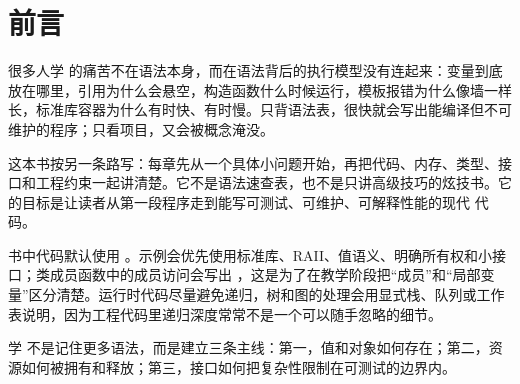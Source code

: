 \chapter*{前言}

很多人学 \cpp 的痛苦不在语法本身，而在语法背后的执行模型没有连起来：变量到底放在哪里，引用为什么会悬空，构造函数什么时候运行，模板报错为什么像墙一样长，标准库容器为什么有时快、有时慢。只背语法表，很快就会写出能编译但不可维护的程序；只看项目，又会被概念淹没。

这本书按另一条路写：每章先从一个具体小问题开始，再把代码、内存、类型、接口和工程约束一起讲清楚。它不是语法速查表，也不是只讲高级技巧的炫技书。它的目标是让读者从第一段程序走到能写可测试、可维护、可解释性能的现代 \cpp 代码。

书中代码默认使用 。示例会优先使用标准库、RAII、值语义、明确所有权和小接口；类成员函数中的成员访问会写出 ，这是为了在教学阶段把“成员”和“局部变量”区分清楚。运行时代码尽量避免递归，树和图的处理会用显式栈、队列或工作表说明，因为工程代码里递归深度常常不是一个可以随手忽略的细节。

\begin{keyidea}
学 \cpp 不是记住更多语法，而是建立三条主线：第一，值和对象如何存在；第二，资源如何被拥有和释放；第三，接口如何把复杂性限制在可测试的边界内。
\end{keyidea}
